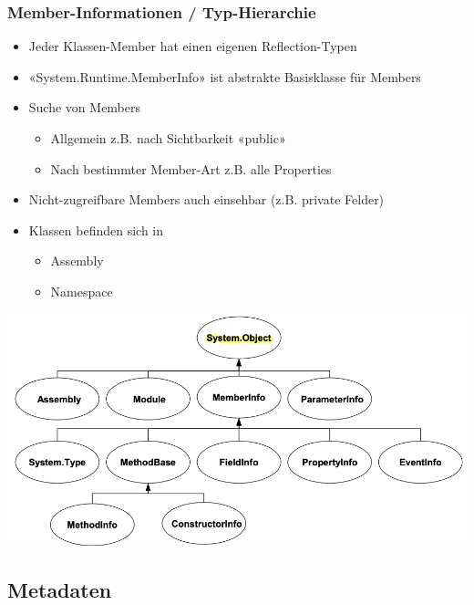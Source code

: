 \subsubsection{Member-Informationen / Typ-Hierarchie}
\begin{itemize}
    \item Jeder Klassen-Member hat einen eigenen Reflection-Typen
    \item «System.Runtime.MemberInfo» ist abstrakte Basisklasse für Members
    \item Suche von Members
    \begin{itemize}
        \item Allgemein z.B. nach Sichtbarkeit «public»
        \item Nach bestimmter Member-Art z.B. alle Properties
    \end{itemize}
    \item Nicht-zugreifbare Members auch einsehbar (z.B. private Felder)
    \item Klassen befinden sich in
    \begin{itemize}
        \item Assembly
        \item Namespace
    \end{itemize}
\end{itemize}
\vspace{-8pt}
\begin{center}
    \includegraphics[scale=.35]{graphic/ref attr/Member-Informationen Typ-Hierarchie.png}
\end{center}
\vspace{-8pt}


\subsection{Metadaten}

